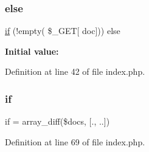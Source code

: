 \mbox{\label{doc_2index_8php_adf992fc38f1b4874925237c49f72cab7}} 
\subsubsection{\texorpdfstring{else}{else}}
{\footnotesize\ttfamily \hyperlink{login_2index_8php_ab51de40bbba7bda6a6baf15c5564dc16}{if} (!empty( \$\+\_\+\+G\+ET\mbox{[} \textquotesingle{}doc\textquotesingle{}\mbox{]})) else}

{\bfseries Initial value\+:}


Definition at line 42 of file index.\+php.

\mbox{\label{doc_2index_8php_a1d555c22cda9d5e40ac4f0c35b5eafc4}} 
\subsubsection{\texorpdfstring{if}{if}}
{\footnotesize\ttfamily if = array\+\_\+diff(\$docs, \mbox{[}\textquotesingle{}.\textquotesingle{}, \textquotesingle{}..\textquotesingle{}\mbox{]})}



Definition at line 69 of file index.\+php.

